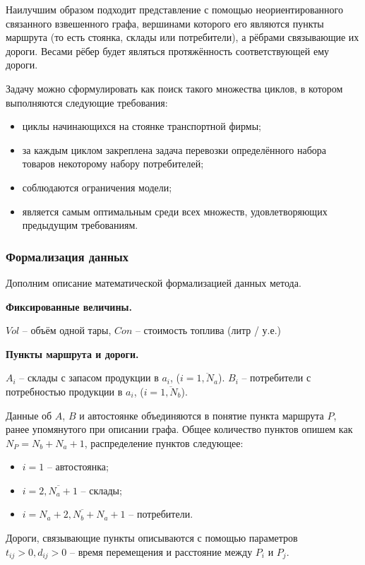 	Наилучшим образом подходит представление с помощью неориентированного связанного взвешенного графа, вершинами которого его являются пункты маршрута (то есть стоянка, склады или потребители), а рёбрами связывающие их дороги. Весами рёбер будет являться протяжённость соответствующей ему дороги.
	
	Задачу можно сформулировать как поиск такого множества циклов, в котором выполняются следующие требования:
	\begin{itemize}
		\item ‌циклы начинающихся на стоянке транспортной фирмы;
		\item ‌за каждым циклом закреплена задача перевозки определённого набора товаров некоторому набору потребителей;
		\item ‌соблюдаются ограничения модели;
		\item ‌является самым оптимальным среди всех множеств, удовлетворяющих предыдущим требованиям.
	\end{itemize}
	
	
	\subsubsection{Формализация данных}
	Дополним описание математической формализацией данных метода. 
	
	\textbf{Фиксированные величины.}
	
	$Vol$ -- объём одной тары, $Con$ -- стоимость топлива (литр / у.е.)
	
	\textbf{Пункты маршрута и дороги.}
	
	$A_i$ -- склады с запасом продукции в $a_i$, ($i = \overline{1, N_a}$). $B_i$ -- потребители с потребностью продукции в $a_i$, ($i = \overline{1, N_b}$).
	
	Данные об $A$, $B$ и автостоянке объединяются в понятие пункта маршрута $P$, ранее упомянутого при описании графа. Общее количество пунктов опишем как $N_P= N_b+N_a+1$, распределение пунктов следующее:
	\begin{itemize}
		\item $i = 1$ -- автостоянка;
		\item $i = \overline{2, N_a + 1}$ -- склады;
		\item $i = \overline{N_a+2, N_b+N_a+1}$ -- потребители.
	\end{itemize} 
	
	Дороги, связывающие пункты описываются с помощью параметров $t_{ij} > 0, d_{ij} > 0$ -- время перемещения и расстояние между $P_i$ и $P_j$.
	
